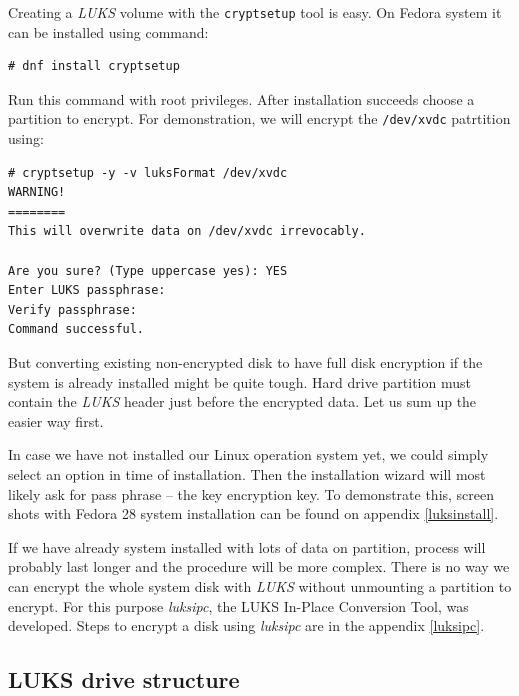 Creating a {\it LUKS} volume with the {\tt cryptsetup} tool is easy.
On Fedora system it can be installed using command:
\begin{lstlisting}[columns=fixed,basicstyle=\ttfamily\footnotesize,tabsize=4,backgroundcolor=\color{yellow!10}]
# dnf install cryptsetup
\end{lstlisting}
Run this command with root privileges.
After installation succeeds choose a partition to encrypt.
For demonstration, we will encrypt the {\tt /dev/xvdc} patrtition using:
\begin{lstlisting}[columns=fixed,basicstyle=\ttfamily\footnotesize,tabsize=4,backgroundcolor=\color{yellow!10}]
# cryptsetup -y -v luksFormat /dev/xvdc
WARNING!
========
This will overwrite data on /dev/xvdc irrevocably.

Are you sure? (Type uppercase yes): YES
Enter LUKS passphrase:
Verify passphrase:
Command successful.
\end{lstlisting}
But converting existing non-encrypted disk to have full disk encryption if the system is already installed might be quite tough.
Hard drive partition must contain the {\it LUKS} header just before the encrypted data.
Let us sum up the easier way first.

In case we have not installed our Linux operation system yet, we could simply select an option in time of installation.
Then the installation wizard will most likely ask for pass phrase -- the key encryption key.
To demonstrate this, screen shots with Fedora 28 system installation can be found on appendix \ref{luksinstall}.

If we have already system installed with lots of data on partition, process will probably last longer and the procedure will be more complex.
There is no way we can encrypt the whole system disk with {\it LUKS} without unmounting a partition to encrypt.
For this purpose {\it luksipc}, the LUKS In-Place Conversion Tool, was developed.
Steps to encrypt a disk using {\it luksipc} are in the appendix \ref{luksipc}.



\subsection{LUKS drive structure}

